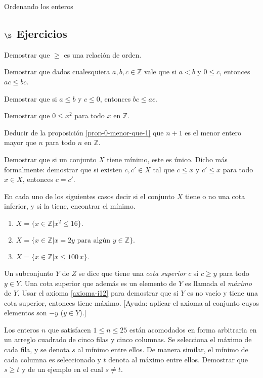 \begin{section}{Ordenando los enteros}
\subsection*{$\S$ Ejercicios}
\begin{enumex}
    \item Demostrar que $\ge$ es una relación de orden.
        
    \item Demostrar que dados cualesquiera $a,b,c \in \mathbb Z$ vale que si $a< b$ y $0\le c$, entonces $ac \le bc$. 
        
    \item Demostrar que si $a\le b$ y $c\le 0$, entonces $bc \le ac$.
        
    \item Demostrar que $0\le x^2$ para todo $x$ en $\mathbb Z$.
        
    \item Deducir de la proposición \ref{prop-0-menor-que-1} que $n+1$ es el menor entero mayor que $n$ para todo $n$ en $\mathbb Z$.

    \item Demostrar que si un conjunto $X$ tiene mínimo, este es único. Dicho más formalmente: demostrar que si existen $c,c' \in X$ tal que  $c\le x$ y $c'\le x$ para todo $x \in X$, entonces $c=c'$. 

    \item En cada uno de los siguientes casos decir si el conjunto $X$ tiene o no una cota inferior, y si la tiene, encontrar el mínimo.
    \begin{enumerate}
        \item $X = \{x \in \mathbb Z | x^2\le 16\}.$
        \item $X =\{x \in \mathbb Z | x=2y \text{\ para algún } y \in \mathbb Z\}.$
        \item $X =\{x \in \mathbb Z | x\le 100\,x\} .$
    \end{enumerate}
    \item Un subconjunto $Y$ de $Z$ se dice que tiene una {\em cota superior} $c$ si $c\ge y$ para todo $y \in Y$.  Una cota superior que además es un elemento de $Y$ es llamada el {\em máximo} de $Y$. Usar el axioma \ref{axioma-i12} para demostrar que si $Y$ es no vacío y tiene una cota superior, entonces tiene máximo. [Ayuda: aplicar el axioma al conjunto cuyos elementos son $-y$ ($y \in Y$).]

    \item Los enteros $n$ que satisfacen $1 \le n \le 25$ están acomodados en forma arbitraria en un arreglo cuadrado de cinco filas y cinco columnas. Se selecciona el máximo  de cada fila, y se denota $s$ al mínimo entre ellos. De manera similar, el mínimo de cada columna es seleccionado y $t$ denota al máximo entre ellos. Demostrar que $s\ge t$ y de un ejemplo en el cual $s\not=t$.
\end{enumex}

\end{section}

